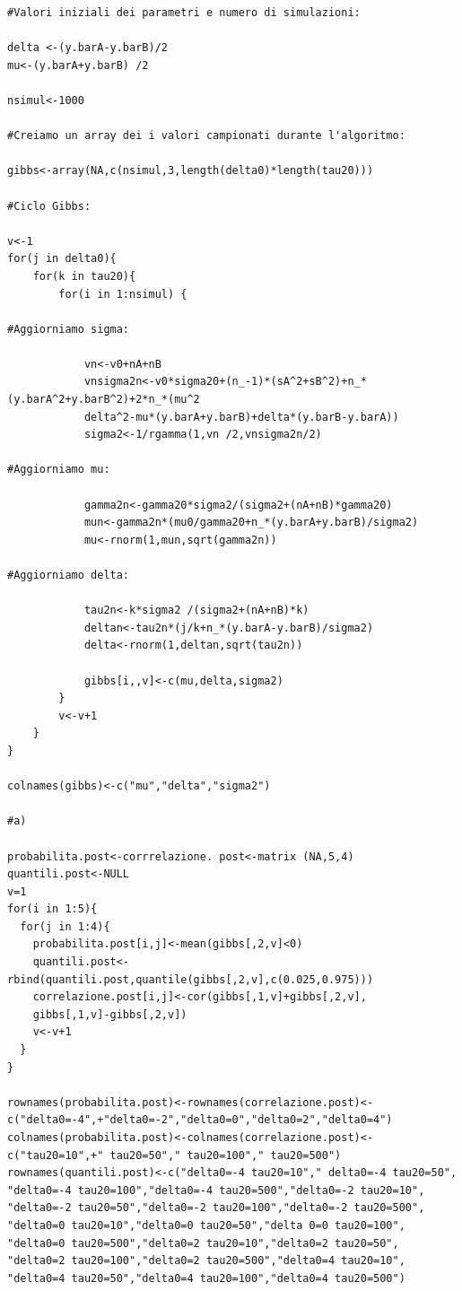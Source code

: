 \begin{itemize}[-]
\begin{lstlisting}[style=R]
#Valori iniziali dei parametri e numero di simulazioni:

delta <-(y.barA-y.barB)/2
mu<-(y.barA+y.barB) /2

nsimul<-1000

#Creiamo un array dei i valori campionati durante l'algoritmo:

gibbs<-array(NA,c(nsimul,3,length(delta0)*length(tau20)))

#Ciclo Gibbs:

v<-1
for(j in delta0){
	for(k in tau20){
		for(i in 1:nsimul) {

#Aggiorniamo sigma:

			vn<-v0+nA+nB
			vnsigma2n<-v0*sigma20+(n_-1)*(sA^2+sB^2)+n_*(y.barA^2+y.barB^2)+2*n_*(mu^2
			delta^2-mu*(y.barA+y.barB)+delta*(y.barB-y.barA))
			sigma2<-1/rgamma(1,vn /2,vnsigma2n/2)

#Aggiorniamo mu:

			gamma2n<-gamma20*sigma2/(sigma2+(nA+nB)*gamma20)
			mun<-gamma2n*(mu0/gamma20+n_*(y.barA+y.barB)/sigma2)
			mu<-rnorm(1,mun,sqrt(gamma2n))

#Aggiorniamo delta:

			tau2n<-k*sigma2 /(sigma2+(nA+nB)*k)
			deltan<-tau2n*(j/k+n_*(y.barA-y.barB)/sigma2)
			delta<-rnorm(1,deltan,sqrt(tau2n))

			gibbs[i,,v]<-c(mu,delta,sigma2)
		}
		v<-v+1
	}
}

colnames(gibbs)<-c("mu","delta","sigma2")

#a)

probabilita.post<-corrrelazione. post<-matrix (NA,5,4)
quantili.post<-NULL
v=1
for(i in 1:5){
  for(j in 1:4){
    probabilita.post[i,j]<-mean(gibbs[,2,v]<0)
    quantili.post<-rbind(quantili.post,quantile(gibbs[,2,v],c(0.025,0.975)))
    correlazione.post[i,j]<-cor(gibbs[,1,v]+gibbs[,2,v],
    gibbs[,1,v]-gibbs[,2,v])
    v<-v+1
  }
}

rownames(probabilita.post)<-rownames(correlazione.post)<-
c("delta0=-4",+"delta0=-2","delta0=0","delta0=2","delta0=4")
colnames(probabilita.post)<-colnames(correlazione.post)<-
c("tau20=10",+" tau20=50"," tau20=100"," tau20=500")
rownames(quantili.post)<-c("delta0=-4 tau20=10"," delta0=-4 tau20=50",
"delta0=-4 tau20=100","delta0=-4 tau20=500","delta0=-2 tau20=10",
"delta0=-2 tau20=50","delta0=-2 tau20=100","delta0=-2 tau20=500",
"delta0=0 tau20=10","delta0=0 tau20=50","delta 0=0 tau20=100",
"delta0=0 tau20=500","delta0=2 tau20=10","delta0=2 tau20=50",
"delta0=2 tau20=100","delta0=2 tau20=500","delta0=4 tau20=10",
"delta0=4 tau20=50","delta0=4 tau20=100","delta0=4 tau20=500")


\end{lstlisting}
\end{itemize}
